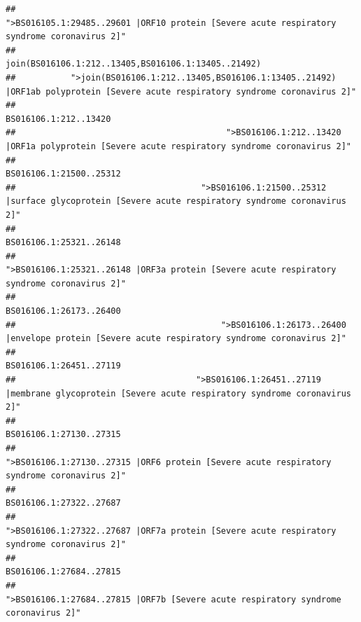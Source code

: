 \documentclass[
]{article}
\begin{document}
\begin{verbatim}
##                                            ">BS016105.1:29485..29601 |ORF10 protein [Severe acute respiratory syndrome coronavirus 2]" 
##                                                                                    join(BS016106.1:212..13405,BS016106.1:13405..21492) 
##           ">join(BS016106.1:212..13405,BS016106.1:13405..21492) |ORF1ab polyprotein [Severe acute respiratory syndrome coronavirus 2]" 
##                                                                                                                  BS016106.1:212..13420 
##                                          ">BS016106.1:212..13420 |ORF1a polyprotein [Severe acute respiratory syndrome coronavirus 2]" 
##                                                                                                                BS016106.1:21500..25312 
##                                     ">BS016106.1:21500..25312 |surface glycoprotein [Severe acute respiratory syndrome coronavirus 2]" 
##                                                                                                                BS016106.1:25321..26148 
##                                            ">BS016106.1:25321..26148 |ORF3a protein [Severe acute respiratory syndrome coronavirus 2]" 
##                                                                                                                BS016106.1:26173..26400 
##                                         ">BS016106.1:26173..26400 |envelope protein [Severe acute respiratory syndrome coronavirus 2]" 
##                                                                                                                BS016106.1:26451..27119 
##                                    ">BS016106.1:26451..27119 |membrane glycoprotein [Severe acute respiratory syndrome coronavirus 2]" 
##                                                                                                                BS016106.1:27130..27315 
##                                             ">BS016106.1:27130..27315 |ORF6 protein [Severe acute respiratory syndrome coronavirus 2]" 
##                                                                                                                BS016106.1:27322..27687 
##                                            ">BS016106.1:27322..27687 |ORF7a protein [Severe acute respiratory syndrome coronavirus 2]" 
##                                                                                                                BS016106.1:27684..27815 
##                                                    ">BS016106.1:27684..27815 |ORF7b [Severe acute respiratory syndrome coronavirus 2]" 

\end{verbatim}
\end{document}
